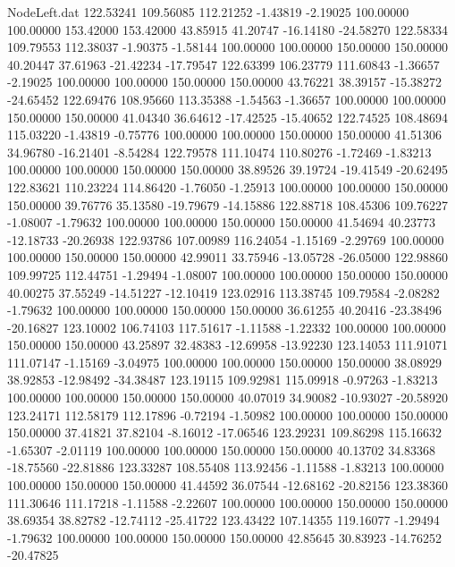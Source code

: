 \begin{filecontents}{NodeLeft.dat}
 122.53241  109.56085  112.21252    -1.43819   -2.19025  100.00000  100.00000  153.42000  153.42000   43.85915   41.20747  -16.14180  -24.58270
 122.58334  109.79553  112.38037    -1.90375   -1.58144  100.00000  100.00000  150.00000  150.00000   40.20447   37.61963  -21.42234  -17.79547
 122.63399  106.23779  111.60843    -1.36657   -2.19025  100.00000  100.00000  150.00000  150.00000   43.76221   38.39157  -15.38272  -24.65452
 122.69476  108.95660  113.35388    -1.54563   -1.36657  100.00000  100.00000  150.00000  150.00000   41.04340   36.64612  -17.42525  -15.40652
 122.74525  108.48694  115.03220    -1.43819   -0.75776  100.00000  100.00000  150.00000  150.00000   41.51306   34.96780  -16.21401   -8.54284
 122.79578  111.10474  110.80276    -1.72469   -1.83213  100.00000  100.00000  150.00000  150.00000   38.89526   39.19724  -19.41549  -20.62495
 122.83621  110.23224  114.86420    -1.76050   -1.25913  100.00000  100.00000  150.00000  150.00000   39.76776   35.13580  -19.79679  -14.15886
 122.88718  108.45306  109.76227    -1.08007   -1.79632  100.00000  100.00000  150.00000  150.00000   41.54694   40.23773  -12.18733  -20.26938
 122.93786  107.00989  116.24054    -1.15169   -2.29769  100.00000  100.00000  150.00000  150.00000   42.99011   33.75946  -13.05728  -26.05000
 122.98860  109.99725  112.44751    -1.29494   -1.08007  100.00000  100.00000  150.00000  150.00000   40.00275   37.55249  -14.51227  -12.10419
 123.02916  113.38745  109.79584    -2.08282   -1.79632  100.00000  100.00000  150.00000  150.00000   36.61255   40.20416  -23.38496  -20.16827
 123.10002  106.74103  117.51617    -1.11588   -1.22332  100.00000  100.00000  150.00000  150.00000   43.25897   32.48383  -12.69958  -13.92230
 123.14053  111.91071  111.07147    -1.15169   -3.04975  100.00000  100.00000  150.00000  150.00000   38.08929   38.92853  -12.98492  -34.38487
 123.19115  109.92981  115.09918    -0.97263   -1.83213  100.00000  100.00000  150.00000  150.00000   40.07019   34.90082  -10.93027  -20.58920
 123.24171  112.58179  112.17896    -0.72194   -1.50982  100.00000  100.00000  150.00000  150.00000   37.41821   37.82104   -8.16012  -17.06546
 123.29231  109.86298  115.16632    -1.65307   -2.01119  100.00000  100.00000  150.00000  150.00000   40.13702   34.83368  -18.75560  -22.81886
 123.33287  108.55408  113.92456    -1.11588   -1.83213  100.00000  100.00000  150.00000  150.00000   41.44592   36.07544  -12.68162  -20.82156
 123.38360  111.30646  111.17218    -1.11588   -2.22607  100.00000  100.00000  150.00000  150.00000   38.69354   38.82782  -12.74112  -25.41722
 123.43422  107.14355  119.16077    -1.29494   -1.79632  100.00000  100.00000  150.00000  150.00000   42.85645   30.83923  -14.76252  -20.47825

\end{filecontents}
